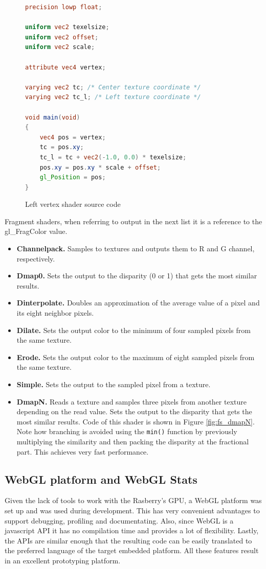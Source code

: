 \documentclass[conference]{IEEEtran}
\begin{document}
\begin{figure}[!t]
 \begin{lstlisting}[language=GLSL, frame=single, basicstyle=\scriptsize]
precision lowp float;

uniform vec2 texelsize;
uniform vec2 offset;
uniform vec2 scale;

attribute vec4 vertex;

varying vec2 tc; /* Center texture coordinate */
varying vec2 tc_l; /* Left texture coordinate */

void main(void) 
{
	vec4 pos = vertex;
	tc = pos.xy;
	tc_l = tc + vec2(-1.0, 0.0) * texelsize;
	pos.xy = pos.xy * scale + offset;
	gl_Position = pos;
}
 \end{lstlisting}
 \caption{Left vertex shader source code}
 \label{fig:vs_left}
\end{figure}

Fragment shaders, when referring to output in the next list it is a reference to the gl\_FragColor value.
\begin{itemize}
 \item {\bfseries Channelpack.} Samples to textures and outputs them to R and G channel, respectively.
 \item {\bfseries Dmap0.} Sets the output to the disparity (0 or 1) that gets the most similar results.
 \item {\bfseries Dinterpolate.} Doubles an approximation of the average value of a pixel and its eight neighbor pixels.
 \item {\bfseries Dilate.} Sets the output color to the  minimum of four sampled pixels from the same texture.
 \item {\bfseries Erode.} Sets the output color to the maximum of eight sampled pixels from the same texture.
 \item {\bfseries Simple.} Sets the output to the sampled pixel from a texture.
 \item {\bfseries DmapN.} Reads a texture and samples three pixels from another texture depending on the read value. Sets the output to the disparity that gets the most similar results. Code of this shader is shown in Figure \ref{fig:fs_dmapN}. Note how branching is avoided using the \texttt{min()} function by previously multiplying the similarity and then packing the disparity at the fractional part. This achieves very fast performance.
\end{itemize}

\subsection{WebGL platform and WebGL Stats}
Given the lack of tools to work with the Rasberry's GPU, a WebGL platform was set up and was used during development. This has very convenient advantages to support debugging, profiling and documentating. Also, since WebGL is a javascript API it has no compilation time and provides a lot of flexibility. Lastly, the APIs are similar enough that the resulting code can be easily translated to the preferred language of the target embedded platform. All these features result in an excellent prototyping platform.
\end{document}
